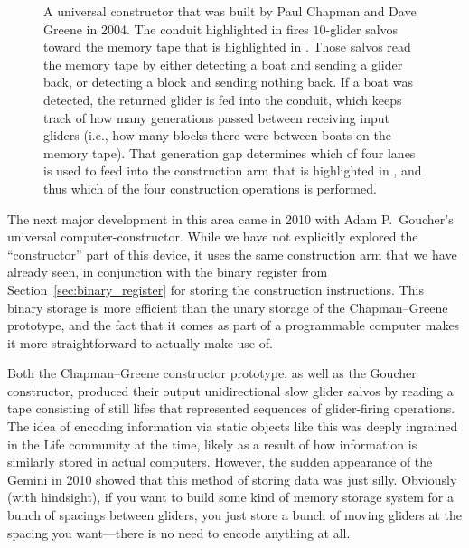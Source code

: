 \begin{figure}[!htbp]
	\centering
	\caption{A universal constructor that was built by Paul Chapman and Dave Greene in 2004. The conduit highlighted in  fires $10$-glider salvos toward the memory tape that is highlighted in . Those salvos read the memory tape by either detecting a boat and sending a glider back, or detecting a block and sending nothing back. If a boat was detected, the returned glider is fed into the  conduit, which keeps track of how many generations passed between receiving input gliders (i.e., how many blocks there were between boats on the memory tape). That generation gap determines which of four lanes is used to feed into the construction arm that is highlighted in , and thus which of the four construction operations is performed.}\label{fig:chapman_greene_constructor}
\end{figure}

The next major development in this area came in 2010 with Adam P.~Goucher's universal computer-constructor. While we have not explicitly explored the ``constructor'' part of this device, it uses the same construction arm that we have already seen, in conjunction with the binary register from Section~\ref{sec:binary_register} for storing the construction instructions. This binary storage is more efficient than the unary storage of the Chapman--Greene prototype, and the fact that it comes as part of a programmable computer makes it more straightforward to actually make use of.

Both the Chapman--Greene constructor prototype, as well as the Goucher constructor, produced their output unidirectional slow glider salvos by reading a tape consisting of still lifes that represented sequences of glider-firing operations. The idea of encoding information via static objects like this was deeply ingrained in the Life community at the time, likely as a result of how information is similarly stored in actual computers. However, the sudden appearance of the Gemini in 2010 showed that this method of storing data was just silly. Obviously (with hindsight), if you want to build some kind of memory storage system for a bunch of spacings between gliders, you just store a bunch of moving gliders at the spacing you want---there is no need to encode anything at all.

